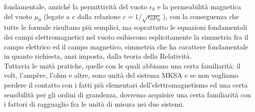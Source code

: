 fondamentale, anzich\'e la permittivit\`a del vuoto $\epsilon_0$ e la
permeabilit\`a magnetica del vuoto $\mu_0$ (legate a $c$ dalla relazione
$c=1/\sqrt{\epsilon_0\mu_0}$\,), con la conseguenza che tutte le formule
risultano pi\`u semplici, ma soprattutto le equazioni fondamentali dei campi
elettromagnetici nel vuoto esibiscono esplicitamente la simmetria fra il campo
elettrico ed il campo magnetico, simmetria che ha carattere fondamentale in
quanto richiesta, anzi imposta, dalla teoria della Relativit\`a.\\
Tuttavia le unit\`a pratiche, quelle con le quali abbiamo una certa
familiarit\`a: il volt, l'amp\`ere, l'ohm e altre, sono unit\`a del sistema MKSA
e se non vogliamo perdere il contatto con i fatti pi\`u elementari
dell'elettromagnetismo ed una certa sensibilit\`a per gli ordini di grandezza,
dovremo acquisire una certa familiarit\`a con i fattori di ragguaglio fra le
unit\`a di misura nei due sistemi.

